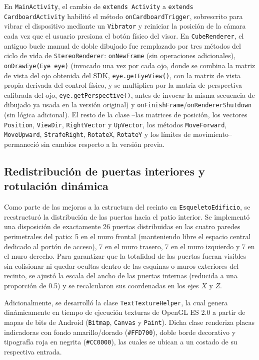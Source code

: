 \documentclass[conference]{IEEEtran}
\begin{document}
	En \texttt{MainActivity}, el cambio de \texttt{extends Activity} a \texttt{extends CardboardActivity} habilitó el método \texttt{onCardboardTrigger}, sobrescrito para vibrar el dispositivo mediante un \texttt{Vibrator} y reiniciar la posición de la cámara cada vez que el usuario presiona el botón físico del visor. En \texttt{CubeRenderer}, el antiguo bucle manual de doble dibujado fue remplazado por tres métodos del ciclo de vida de \texttt{StereoRenderer}: \texttt{onNewFrame} (sin operaciones adicionales), \texttt{onDrawEye(Eye eye)} (invocado una vez por cada ojo, donde se combina la matriz de vista del ojo obtenida del SDK, \texttt{eye.getEyeView()}, con la matriz de vista propia derivada del control físico, y se multiplica por la matriz de perspectiva calibrada del ojo, \texttt{eye.getPerspective()}, antes de invocar la misma secuencia de dibujado ya usada en la versión original) y \texttt{onFinishFrame}/\texttt{onRendererShutdown} (sin lógica adicional). El resto de la clase --las matrices de posición, los vectores \texttt{Position}, \texttt{ViewDir}, \texttt{RightVector} y \texttt{UpVector}, los métodos \texttt{MoveForward}, \texttt{MoveUpward}, \texttt{StrafeRight}, \texttt{RotateX}, \texttt{RotateY} y los límites de movimiento-- permaneció sin cambios respecto a la versión previa.
	
	
	\subsection{Redistribución de puertas interiores y rotulación dinámica}
	Como parte de las mejoras a la estructura del recinto en \texttt{EsqueletoEdificio}, se reestructuró la distribución de las puertas hacia el patio interior. Se implementó una disposición de exactamente 26 puertas distribuidas en las cuatro paredes perimetrales del patio: 5 en el muro frontal (manteniendo libre el espacio central dedicado al portón de acceso), 7 en el muro trasero, 7 en el muro izquierdo y 7 en el muro derecho. Para garantizar que la totalidad de las puertas fueran visibles sin colisionar ni quedar ocultas dentro de las esquinas o muros exteriores del recinto, se ajustó la escala del ancho de las puertas internas (reducida a una proporción de 0.5) y se recalcularon sus coordenadas en los ejes $X$ y $Z$.
	
	Adicionalmente, se desarrolló la clase \texttt{TextTextureHelper}, la cual genera dinámicamente en tiempo de ejecución texturas de OpenGL ES 2.0 a partir de mapas de bits de Android (\texttt{Bitmap}, \texttt{Canvas} y \texttt{Paint}). Dicha clase renderiza placas indicadoras con fondo amarillo/dorado (\texttt{\#FFD700}), doble borde decorativo y tipografía roja en negrita (\texttt{\#CC0000}), las cuales se ubican a un costado de su respectiva entrada. 
	
\end{document}
